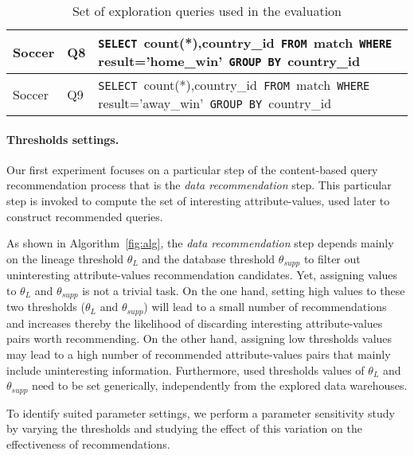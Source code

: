\begin{table}[t]
{\begin{tabular}{|p{1.5cm}|p{0.5cm}|p{8cm}|}
Soccer&Q8 &\texttt{SELECT }count(*),country\_id\texttt{ FROM }match\texttt{ WHERE }result='home\_win'\texttt{ GROUP BY }country\_id\\ \hline
Soccer&Q9 &\texttt{SELECT }count(*),country\_id\texttt{ FROM }match\texttt{ WHERE }result='away\_win'\texttt{ GROUP BY }country\_id\\ \hline
  
\end{tabular}
}
 \caption{Set of exploration queries used in the evaluation}
 \label{tab:queries1}
 \end{table}
 



 \paragraph*{\textbf{Thresholds settings.}}

Our first experiment focuses on a particular step of  the content-based query recommendation process that is the \emph{data recommendation} step. 
This particular step is invoked to compute the set of interesting attribute-values, used later to construct recommended queries.

As shown in Algorithm~\ref{fig:alg}, the \emph{data recommendation} step depends mainly on the lineage threshold $\theta_{L}$ and the database threshold $\theta_{supp}$ to filter out uninteresting attribute-values recommendation candidates. Yet, assigning values to $\theta_{L}$  and $\theta_{supp}$ is not a trivial task.
On the one hand, setting high values to these two thresholds ($\theta_{L}$ and $\theta_{supp}$) will lead to a small number of recommendations and increases thereby the likelihood of discarding interesting attribute-values pairs worth recommending. On the other hand, assigning low thresholds values may lead to a high number of recommended attribute-values pairs that mainly include uninteresting information.
Furthermore, used thresholds values of $\theta_{L}$ and $\theta_{supp}$ need to be set generically, independently from the explored data warehouses. 


To identify suited parameter settings, we perform a parameter sensitivity study by varying the thresholds and studying the effect of this variation on the effectiveness of recommendations.


